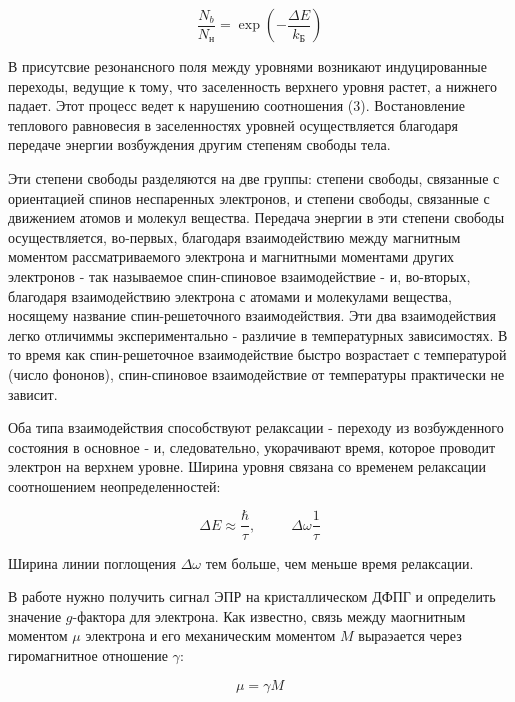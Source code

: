 \documentclass[a4paper]{article}
\begin{document}
\begin{equation}
    \frac{N_b}{N_н} = \exp{ \left( -\frac{\Delta E}{k_Б} \right ) }
\end{equation}

В присутсвие резонансного поля между уровнями возникают индуцированные переходы, ведущие к тому, что заселенность верхнего уровня растет, а нижнего падает. 
Этот процесс ведет к нарушению соотношения (3). Востановление теплового равновесия в заселенностях уровней осуществляется благодаря передаче энергии 
возбуждения другим степеням свободы тела. \par 

Эти степени свободы разделяются на две группы: степени свободы, связанные с ориентацией спинов неспаренных электронов, и степени свободы, связанные с 
движением атомов и молекул вещества. Передача энергии в эти степени свободы осуществляется, во-первых, благодаря взаимодействию между магнитным моментом 
рассматриваемого электрона и магнитными моментами других электронов - так называемое спин-спиновое взаимодействие - и, во-вторых, благодаря 
взаимодействию электрона с атомами и молекулами вещества, носящему название спин-решеточного взаимодействия. Эти два взаимодействия легко отличиммы 
экспериментально - различие в температурных зависимостях. В то время как спин-решеточное взаимодействие быстро возрастает с температурой (число фононов), спин-спиновое 
взаимодействие от температуры практически не зависит. \par 

Оба типа взаимодействия способствуют релаксации - переходу из возбужденного состояния в основное - и, следовательно, укорачивают время, которое проводит электрон на верхнем уровне. 
Ширина уровня связана со временем релаксации соотношением неопределенностей:

\begin{equation}
    \Delta E \approx \frac{\hbar}{\tau}, \;\;\;\;\;\;\;\;\; \Delta \omega \frac{1}{\tau}
\end{equation}

Ширина линии поглощения $\Delta \omega$ тем больше, чем меньше время релаксации. \par 

В работе нужно получить сигнал ЭПР на кристаллическом ДФПГ и определить значение $g$-фактора для электрона. 
Как известно, связь между маогнитным моментом $\mu$ электрона и его механическим моментом $M$ выраэается через 
гиромагнитное отношение $\gamma$:

\begin{equation}
    \mu = \gamma M
\end{equation}
 
\end{document}
